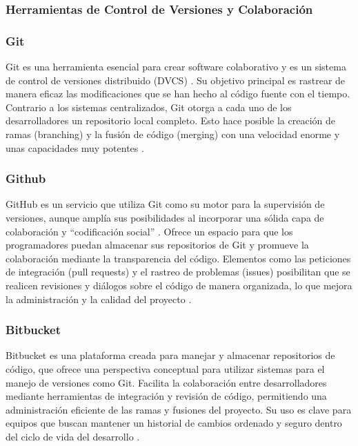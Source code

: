 \subsubsection{Herramientas de Control de Versiones y Colaboración}

\subsubsection*{\hspace{0.7cm}Git}
Git es una herramienta esencial para crear software colaborativo y es un sistema de control de versiones distribuido (DVCS) \cite{loeliger2012version}. Su objetivo principal es rastrear de manera eficaz las modificaciones que se han hecho al código fuente con el tiempo. Contrario a los sistemas centralizados, Git otorga a cada uno de los desarrolladores un repositorio local completo. Esto hace posible la creación de ramas (branching) y la fusión de código (merging) con una velocidad enorme y unas capacidades muy potentes \cite{loeliger2012version}.

\subsubsection*{\hspace{0.7cm}Github}
GitHub es un servicio que utiliza Git como su motor para la supervisión de versiones, aunque amplía sus posibilidades al incorporar una sólida capa de colaboración y ``codificación social'' \cite{dabbish2012social}. Ofrece un espacio para que los programadores puedan almacenar sus repositorios de Git y promueve la colaboración mediante la transparencia del código. Elementos como las peticiones de integración (pull requests) y el rastreo de problemas (issues) posibilitan que se realicen revisiones y diálogos sobre el código de manera organizada, lo que mejora la administración y la calidad del proyecto \cite{dabbish2012social}.

\subsubsection*{\hspace{0.7cm}Bitbucket}
Bitbucket es una plataforma creada para manejar y almacenar repositorios de código, que ofrece una perspectiva conceptual para utilizar sistemas para el manejo de versiones como Git. Facilita la colaboración entre desarrolladores mediante herramientas de integración y revisión de código, permitiendo una administración eficiente de las ramas y fusiones del proyecto. Su uso es clave para equipos que buscan mantener un historial de cambios ordenado y seguro dentro del ciclo de vida del desarrollo \cite{chakraborty2022practical}.

